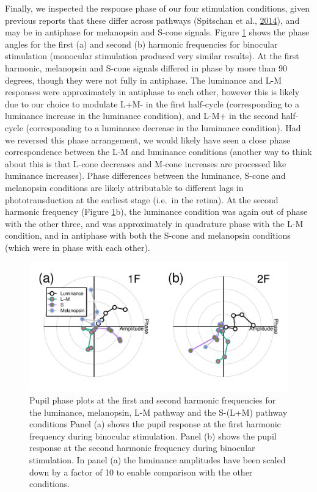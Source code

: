 \documentclass[
]{article}
\begin{document}
Finally, we inspected the response phase of our four stimulation conditions, given previous reports that these differ across pathways (Spitschan et al., \protect\hyperlink{ref-Spitschan2014}{2014}), and may be in antiphase for melanopsin and S-cone signals. Figure \ref{fig:phaseplots} shows the phase angles for the first (a) and second (b) harmonic frequencies for binocular stimulation (monocular stimulation produced very similar results). At the first harmonic, melanopsin and S-cone signals differed in phase by more than 90 degrees, though they were not fully in antiphase. The luminance and L-M responses were approximately in antiphase to each other, however this is likely due to our choice to modulate L+M- in the first half-cycle (corresponding to a luminance increase in the luminance condition), and L-M+ in the second half-cycle (corresponding to a luminance decrease in the luminance condition). Had we reversed this phase arrangement, we would likely have seen a close phase correspondence between the L-M and luminance conditions (another way to think about this is that L-cone decreases and M-cone increases are processed like luminance increases). Phase differences between the luminance, S-cone and melanopsin conditions are likely attributable to different lags in phototransduction at the earliest stage (i.e.~in the retina). At the second harmonic frequency (Figure \ref{fig:phaseplots}b), the luminance condition was again out of phase with the other three, and was approximately in quadrature phase with the L-M condition, and in antiphase with both the S-cone and melanopsin conditions (which were in phase with each other).

\begin{figure}

{\centering \includegraphics{Figures/phaseplots} 

}

\caption{Pupil phase plots at the first and second harmonic frequencies for the luminance, melanopsin, L-M pathway and the S-(L+M) pathway conditions Panel (a) shows the pupil response at the first harmonic frequency during binocular stimulation. Panel (b) shows the pupil response at the second harmonic frequency during binocular stimulation. In panel (a) the luminance amplitudes have been scaled down by a factor of 10 to enable comparison with the other conditions.}\label{fig:phaseplots}
\end{figure}
\end{document}
